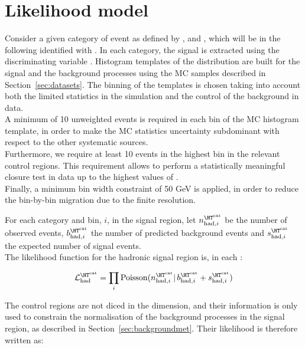 \section{Likelihood model}
\label{sec:likelihood}

Consider a given category of event as defined by \njet, \nb and \scalht, which will be in the following identified with \htcat. 
In each category, the signal is extracted using the discriminating variable \mht. 
Histogram templates of the \mht distribution are built for the signal and the background processes 
using the MC samples described in Section~\ref{sec:datasets}. 
The binning of the templates is chosen taking into account both the limited statistics in the simulation and 
the control of the background in data. \\
A minimum of 10 unweighted events is required in each bin of the MC histogram template, 
in order to make the MC statistics uncertainty subdominant with respect to the other systematic sources. \\
Furthermore, we require at least 10 events in the highest bin in the relevant control regions.
This requirement allows to perform a statistically meaningful closure test in data up to the highest values of \mht.\\
Finally, a minimum bin width constraint of 50 GeV is applied, 
in order to reduce the bin-by-bin migration due to the finite \mht resolution.

For each category \htcat and \mht bin, $i$, in the signal region, let $n^{\htcat}_{\mathrm{had},i}$ be the number of observed events, $b^{\htcat}_{\mathrm{had},i}$ the number of predicted background events and $s^{\htcat}_{\mathrm{had},i}$ the expected number of signal events. \\
The likelihood function for the hadronic signal region is, in each \htcat:

\begin{equation}
\mathcal{L}^{\htcat}_{\mathrm{had}}=\prod_i \mathrm{Poisson}(n^{\htcat}_{\mathrm{had},i} |\, b^{\htcat}_{\mathrm{had},i} + s^{\htcat}_{\mathrm{had},i})
\label{eq:hadronicLikelihood}
\end{equation}

The control regions are not diced in the \mht dimension, and their information is only used to constrain the normalisation of the background processes 
in the signal region, as described in Section~\ref{sec:backgroundmet}. 
Their likelihood is therefore written as:

